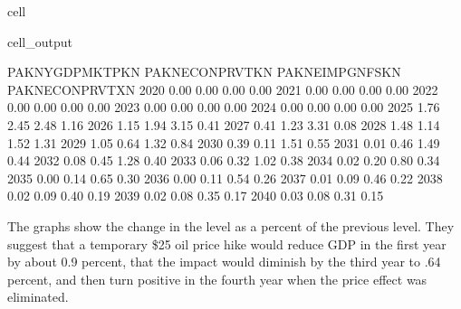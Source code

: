 \documentclass[letterpaper,10pt,english]{jupyterBook}
\begin{document}
\begin{sphinxuseclass}{cell}
\begin{sphinxVerbatimOutput}
\begin{sphinxuseclass}{cell_output}
\begin{sphinxVerbatim}[commandchars=\\\{\}]
      PAKNYGDPMKTPKN  PAKNECONPRVTKN  PAKNEIMPGNFSKN  PAKNECONPRVTXN
2020            0.00            0.00            0.00            0.00
2021           \PYGZhy{}0.00           \PYGZhy{}0.00           \PYGZhy{}0.00            0.00
2022           \PYGZhy{}0.00            0.00            0.00            0.00
2023            0.00            0.00            0.00            0.00
2024            0.00            0.00            0.00            0.00
2025           \PYGZhy{}1.76           \PYGZhy{}2.45           \PYGZhy{}2.48            1.16
2026           \PYGZhy{}1.15           \PYGZhy{}1.94           \PYGZhy{}3.15            0.41
2027           \PYGZhy{}0.41           \PYGZhy{}1.23           \PYGZhy{}3.31           \PYGZhy{}0.08
2028            1.48            1.14           \PYGZhy{}1.52           \PYGZhy{}1.31
2029            1.05            0.64           \PYGZhy{}1.32           \PYGZhy{}0.84
2030            0.39           \PYGZhy{}0.11           \PYGZhy{}1.51           \PYGZhy{}0.55
2031            0.01           \PYGZhy{}0.46           \PYGZhy{}1.49           \PYGZhy{}0.44
2032           \PYGZhy{}0.08           \PYGZhy{}0.45           \PYGZhy{}1.28           \PYGZhy{}0.40
2033           \PYGZhy{}0.06           \PYGZhy{}0.32           \PYGZhy{}1.02           \PYGZhy{}0.38
2034           \PYGZhy{}0.02           \PYGZhy{}0.20           \PYGZhy{}0.80           \PYGZhy{}0.34
2035           \PYGZhy{}0.00           \PYGZhy{}0.14           \PYGZhy{}0.65           \PYGZhy{}0.30
2036           \PYGZhy{}0.00           \PYGZhy{}0.11           \PYGZhy{}0.54           \PYGZhy{}0.26
2037           \PYGZhy{}0.01           \PYGZhy{}0.09           \PYGZhy{}0.46           \PYGZhy{}0.22
2038           \PYGZhy{}0.02           \PYGZhy{}0.09           \PYGZhy{}0.40           \PYGZhy{}0.19
2039           \PYGZhy{}0.02           \PYGZhy{}0.08           \PYGZhy{}0.35           \PYGZhy{}0.17
2040           \PYGZhy{}0.03           \PYGZhy{}0.08           \PYGZhy{}0.31           \PYGZhy{}0.15
\end{sphinxVerbatim}

\end{sphinxuseclass}\end{sphinxVerbatimOutput}

\end{sphinxuseclass}
\sphinxAtStartPar
The graphs show the change in the level as a percent of the previous level. They suggest that a temporary \$25 oil price hike would reduce GDP in the first year by about 0.9 percent, that the impact would diminish by the third year to \sphinxhyphen{}.64 percent, and then turn positive in the fourth year when the price effect was eliminated.
\end{document}
